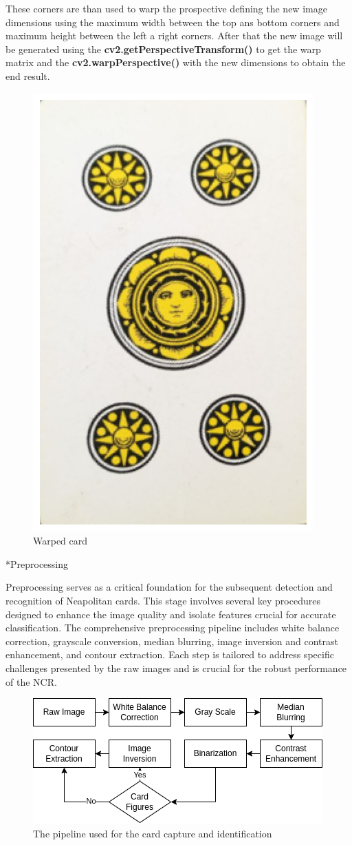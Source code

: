 \documentclass[twocolumn, a4paper,10pt]{article}
\makeatletter
\renewcommand\subsection{\@startsection{subsection}{1}{\z@}{\z@}{\z@}{\normalfont\normalsize\bfseries}}
\renewcommand\subsection{\@startsection{subsection}{1}{\z@}{\z@}{0.1pt}{\normalfont\normalsize\bfseries}}
\makeatother
\begin{document}
These corners are than used to warp the prospective defining the new image dimensions using the maximum width between the top ans bottom corners and maximum height between the left a right corners. After that the new image will be generated using the \textbf{cv2.getPerspectiveTransform()} to get the warp matrix and the \textbf{cv2.warpPerspective()} with the new dimensions to obtain the end result.

\begin{figure}[H]
  \centering
\includegraphics[width=.26\textwidth]{img/4-warped.png}
\caption*{Warped card} 
\end{figure}

\subsection*{Preprocessing}

Preprocessing serves as a critical foundation for the subsequent detection and recognition of Neapolitan cards. This stage involves several key procedures designed to enhance the image quality and isolate features crucial for accurate classification. The comprehensive preprocessing pipeline includes  white balance correction, grayscale conversion, median blurring, image inversion and contrast enhancement, and contour extraction. Each step is tailored to address specific challenges presented by the raw images and is crucial for the robust performance of the NCR.
 
\begin{figure}[H]
  \centering
\includegraphics[width=.4\textwidth]{img/Preprocessing-Pipeline.png}
\caption*{The pipeline used for the card capture and identification} 
\end{figure}
\end{document}
